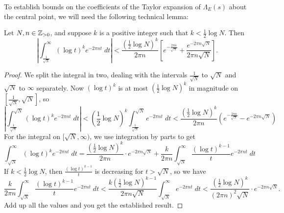 \documentclass[10pt]{article}
\newcommand{\Lams}{\Lambda_E(s)}
\begin{document}
To establish bounds on the coefficients of the Taylor expansion of $\Lams$ about the central point, we will need the following technical lemma:
\begin{lemma}\label{lem:central_deriv_int_bounds}
Let $N,n \in \mathbb{Z}_{>0}$, and suppose $k$ is a positive integer such that $k < \frac{1}{2}\log N$. Then
\begin{equation}
\left| \int_{\frac{1}{\sqrt{N}}}^{\infty} (\log t)^{k} e^{-2\pi n t} \; dt \right| < \frac{\left(\frac{1}{2} \log N\right)^{k}}{2\pi n}\left[ e^{-\frac{2\pi n}{\sqrt{N}}} + \frac{e^{-2\pi n\sqrt{N}}}{2\pi n \sqrt N} \right].
\end{equation}
\end{lemma}
\begin{proof}
We split the integral in two, dealing with the intervals $\frac{1}{\sqrt{N}}$ to $\sqrt{N}$ and $\sqrt{N}$ to $\infty$ separately. Now $(\log t)^{k}$ is at most $(\frac{1}{2}\log N)^k$ in magnitude on $[\frac{1}{\sqrt{N}},\sqrt{N}]$, so
\begin{equation*}
\left| \int_{\frac{1}{\sqrt{N}}}^{\sqrt{N}} (\log t)^{k} e^{-2\pi n t} \; dt \right| < \left(\frac{1}{2} \log N\right)^k \int_{\frac{1}{\sqrt{N}}}^{\sqrt{N}} e^{-2\pi n t} \; dt < \frac{\left(\frac{1}{2} \log N\right)^{k}}{2\pi n}\left(e^{-\frac{2\pi n}{\sqrt{N}}} - e^{-2\pi n\sqrt{N}}\right)
\end{equation*}
For the integral on $[\sqrt{N},\infty)$, we use integration by parts to get
\begin{equation*}
\int_{\sqrt{N}}^{\infty} \left(\log t \right)^{k} e^{-2\pi n t} \; dt = \frac{\left(\frac{1}{2} \log N\right)^{k}}{2\pi n}\cdot e^{-2\pi n\sqrt{N}} + \frac{k}{2\pi n} \int_{\sqrt{N}}^{\infty} \frac{\left(\log t \right)^{k-1}}{t} e^{-2\pi n t} \; dt 
\end{equation*}
If $k < \frac{1}{2}\log N$, then $\frac{\left(\log t \right)^{k-1}}{t}$ is decreasing for $t > \sqrt{N}$, so we have
\begin{equation*}
\frac{k}{2\pi n} \int_{\sqrt{N}}^{\infty} \frac{\left(\log t \right)^{k-1}}{t} e^{-2\pi n t} \; dt < \frac{k\left(\frac{1}{2} \log N\right)^{k-1}}{2\pi n\sqrt{N}} \int_{\sqrt{N}}^{\infty} e^{-2\pi n t} \; dt < \frac{\left(\frac{1}{2} \log N\right)^{k}}{(2\pi n)^2 \sqrt{N}} \cdot e^{-2\pi n \sqrt{N}}.
\end{equation*}
Add up all the values and you get the established result.
\end{proof}
\end{document}
